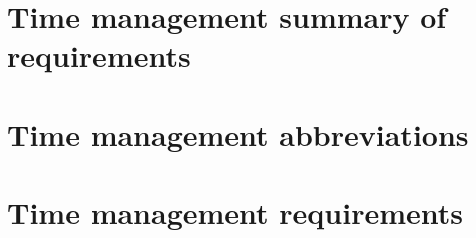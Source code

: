 \section{Time management summary of requirements}


\section{Time management abbreviations}


%

%

\newpage

\section{Time management requirements}

\setcounter{section}{0}
\renewcommand{\thesection}{\shortname\arabic{section}}
\renewcommand{\thesubsection}{\shortname\arabic{section}.\arabic{subsection}}
\renewcommand{\thesubsubsection}{\shortname\arabic{section}.\arabic{subsection}.\arabic{subsubsection}}




